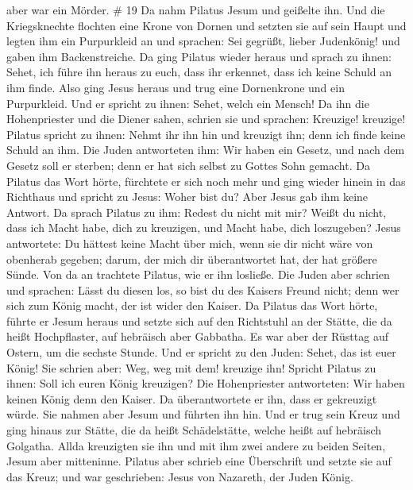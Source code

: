 aber war ein Mörder. \# 19  Da nahm Pilatus Jesum und
geißelte ihn.  Und die Kriegsknechte flochten eine Krone von
Dornen und setzten sie auf sein Haupt und legten ihm ein Purpurkleid an
 und sprachen: Sei gegrüßt, lieber Judenkönig! und gaben ihm
Backenstreiche.  Da ging Pilatus wieder heraus und sprach zu
ihnen: Sehet, ich führe ihn heraus zu euch, dass ihr erkennet, dass ich
keine Schuld an ihm finde.  Also ging Jesus heraus und trug
eine Dornenkrone und ein Purpurkleid. Und er spricht zu ihnen: Sehet,
welch ein Mensch!  Da ihn die Hohenpriester und die Diener
sahen, schrien sie und sprachen: Kreuzige! kreuzige! Pilatus spricht zu
ihnen: Nehmt ihr ihn hin und kreuzigt ihn; denn ich finde keine Schuld
an ihm.  Die Juden antworteten ihm: Wir haben ein Gesetz,
und nach dem Gesetz soll er sterben; denn er hat sich selbst zu Gottes
Sohn gemacht.  Da Pilatus das Wort hörte, fürchtete er sich
noch mehr  und ging wieder hinein in das Richthaus und
spricht zu Jesus: Woher bist du? Aber Jesus gab ihm keine Antwort.
 Da sprach Pilatus zu ihm: Redest du nicht mit mir? Weißt
du nicht, dass ich Macht habe, dich zu kreuzigen, und Macht habe, dich
loszugeben?  Jesus antwortete: Du hättest keine Macht über
mich, wenn sie dir nicht wäre von obenherab gegeben; darum, der mich dir
überantwortet hat, der hat größere Sünde.  Von da an
trachtete Pilatus, wie er ihn losließe. Die Juden aber schrien und
sprachen: Lässt du diesen los, so bist du des Kaisers Freund nicht; denn
wer sich zum König macht, der ist wider den Kaiser.  Da
Pilatus das Wort hörte, führte er Jesum heraus und setzte sich auf den
Richtstuhl an der Stätte, die da heißt Hochpflaster, auf hebräisch aber
Gabbatha.  Es war aber der Rüsttag auf Ostern, um die
sechste Stunde. Und er spricht zu den Juden: Sehet, das ist euer König!
 Sie schrien aber: Weg, weg mit dem! kreuzige ihn! Spricht
Pilatus zu ihnen: Soll ich euren König kreuzigen? Die Hohenpriester
antworteten: Wir haben keinen König denn den Kaiser.  Da
überantwortete er ihn, dass er gekreuzigt würde. Sie nahmen aber Jesum
und führten ihn hin.  Und er trug sein Kreuz und ging
hinaus zur Stätte, die da heißt Schädelstätte, welche heißt auf
hebräisch Golgatha.  Allda kreuzigten sie ihn und mit ihm
zwei andere zu beiden Seiten, Jesum aber mitteninne. 
Pilatus aber schrieb eine Überschrift und setzte sie auf das Kreuz; und
war geschrieben: Jesus von Nazareth, der Juden König. 

